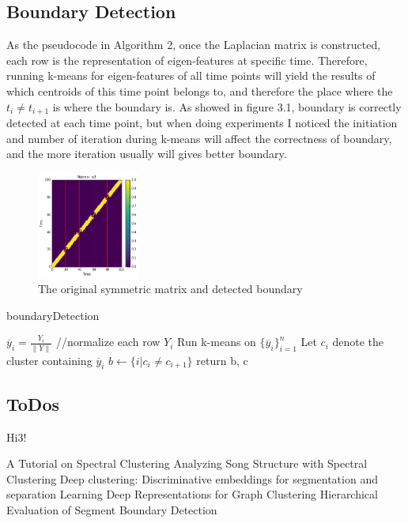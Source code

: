 \documentclass[final]{siamltexmm}
\begin{document}
\subsection{Boundary Detection}
As the pseudocode in Algorithm 2, once the Laplacian matrix is constructed, each row is the representation of eigen-features at specific time. Therefore, running k-means for eigen-features of all time points will yield the results of which centroids of this time point belongs to, and therefore the place where the $t_{i} \neq t_{i+1}$ is where the boundary is. As showed in figure 3.1, boundary is correctly detected at each time point, but when doing experiments I noticed the initiation and number of iteration during k-means will affect the correctness of boundary, and the more iteration usually will gives better boundary.
\begin{figure}[H]
  \centering
    \includegraphics[width=0.3\textwidth]{./figure/o3_boundary.png}
  \caption{The original symmetric matrix and detected boundary}
\end{figure}

\begin{algorithm}[htb]
  \caption{boundaryDetection}

  \label{algo:SC}
\begin{algorithmic}[1]
  \STATE $ \overline y_i = \frac{Y_i}{\parallel Y \parallel}$ //normalize each row $Y_i$
  \STATE Run k-means on $\{ \overline y_i \}_{i=1}^{n}$
  \STATE Let $c_i$ denote the cluster containing $ \overline y_i$
  \STATE $b \leftarrow \{ i|c_i \neq c_{i+1}\}$
  \STATE return b, c
\end{algorithmic}
\end{algorithm}




\subsection{ToDos}
Hi3!

\begin{thebibliography}{10}
 {\sc A Tutorial on Spectral Clustering}
 {\sc Analyzing Song Structure with Spectral Clustering}
 {\sc Deep clustering: Discriminative embeddings for
segmentation and separation}
 {\sc Learning Deep Representations for Graph Clustering}
 {\sc Hierarchical Evaluation of Segment Boundary Detection}
\end{thebibliography}
\end{document}
